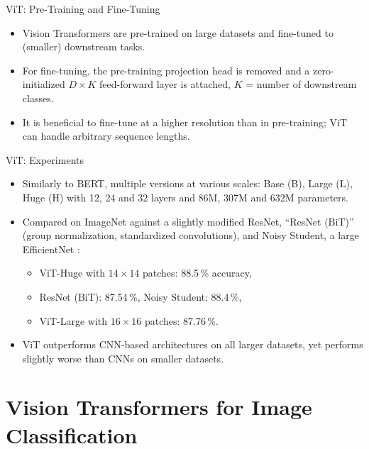 \begin{frame}{ViT: Pre-Training and Fine-Tuning}
\begin{itemize}
  \item Vision Transformers are pre-trained on large datasets and fine-tuned to (smaller) downstream tasks.
  \item For fine-tuning, the pre-training projection head is removed and a zero-initialized $D \times K$ feed-forward layer is attached, $K$ = number of downstream classes.
  \item It is beneficial to fine-tune at a higher resolution than in pre-training; ViT can handle arbitrary sequence lengths.
\end{itemize}
\end{frame}

\begin{frame}{ViT: Experiments}
\begin{itemize}
  \item Similarly to BERT, multiple versions at various scales: Base (B), Large (L), Huge (H) with 12, 24 and 32 layers and 86M, 307M and 632M parameters.
  \item Compared on ImageNet against a slightly modified ResNet, ``ResNet (BiT)'' (group normalization, standardized convolutions), and Noisy Student, a large EfficientNet :
  \begin{itemize}
    \item ViT-Huge with $14\times14$ patches: 88.5\,\% accuracy,
    \item ResNet (BiT): 87.54\,\%, Noisy Student: 88.4\,\%,
    \item ViT-Large with $16\times16$ patches: 87.76\,\%.
  \end{itemize}
  \item ViT outperforms CNN-based architectures on all larger datasets, yet performs slightly worse than CNNs on smaller datasets.
\end{itemize}
\end{frame}

\section{Vision Transformers for Image Classification}

